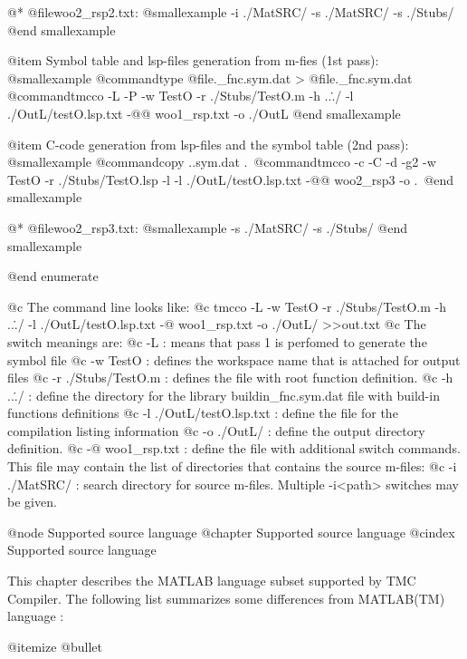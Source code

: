 @*
@file{woo2_rsp2.txt}:
@smallexample
-i ./MatSRC/
-s ./MatSRC/
-s ./Stubs/
@end smallexample

@item  Symbol table and lsp-files generation from m-fies (1st pass):
@smallexample
@command{type}  @file{.\Stubs\external_fnc.sym.dat} > @file{.\OutL\external_fnc.sym.dat}
@command{tmcco} -L -P -w TestO  -r ./Stubs/TestO.m -h ..\../  -l ./OutL/testO.lsp.txt
 -@@ woo1_rsp.txt -o ./OutL
@end smallexample

@item  C-code generation from lsp-files and the symbol table (2nd pass):
@smallexample
@command{copy} 	.\OutL\TestO.sym.dat .\Stubs\
@command{tmcco}  -c -C -d -g2 -w TestO -r ./Stubs/TestO.lsp -l -l ./OutL/testO.lsp.txt
-@@ woo2_rsp3 -o .\OutC\ 
@end smallexample

@*
@file{woo2_rsp3.txt}:
@smallexample
-s ./MatSRC/
-s ./Stubs/
@end smallexample

@end enumerate

@c The command line looks like:
@c tmcco  -L -w TestO  -r ./Stubs/TestO.m -h ..\../ -l ./OutL/testO.lsp.txt -@ woo1_rsp.txt  -o ./OutL/ >>out.txt
@c The switch meanings are:
@c  -L : means that pass 1 is perfomed to generate the symbol file 
@c -w TestO : defines the workspace name that is attached for output files
@c  -r ./Stubs/TestO.m : defines the file with root function definition.
@c  -h  ..\../ : define the directory for the library buildin_fnc.sym.dat file with build-in functions definitions
@c  -l ./OutL/testO.lsp.txt : define the file for the compilation listing information
@c  -o ./OutL/ : define the output directory definition.
@c   -@ woo1_rsp.txt : define the file with additional switch commands. This file may contain the list of directories that contains the source m-files: 
@c   -i ./MatSRC/  : search directory for source m-files. Multiple -i<path> switches may be given.


@node Supported source language
@chapter Supported source language
@cindex Supported source language

  This chapter describes the MATLAB language subset supported by TMC Compiler. 
The following list summarizes some differences   from MATLAB(TM) language :

@itemize @bullet

